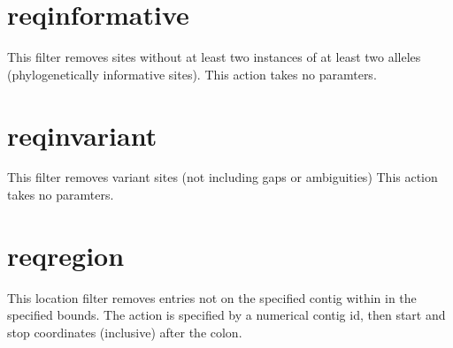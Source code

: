 \documentclass[letterpaper,11pt,english]{sphinxmanual}
\begin{document}
\section{reqinformative}
\label{\detokenize{mvf_filter_modules:reqinformative}}
This filter removes sites without at least two instances of
at least two alleles (phylogenetically informative sites).
This action takes no paramters.

%
\begin{sphinxVerbatim}[commandchars=\\\{\}]
  
 
 
 
\end{sphinxVerbatim}


\section{reqinvariant}
\label{\detokenize{mvf_filter_modules:reqinvariant}}
This filter removes variant sites (not including gaps or ambiguities)
This action takes no paramters.

%
\begin{sphinxVerbatim}[commandchars=\\\{\}]
  
 
 
 
 
\end{sphinxVerbatim}


\section{reqregion}
\label{\detokenize{mvf_filter_modules:reqregion}}
This location filter removes entries not on the specified contig
within in the specified bounds.
The action is specified by a numerical contig id, then start and
stop coordinates (inclusive) after the colon.
\end{document}
